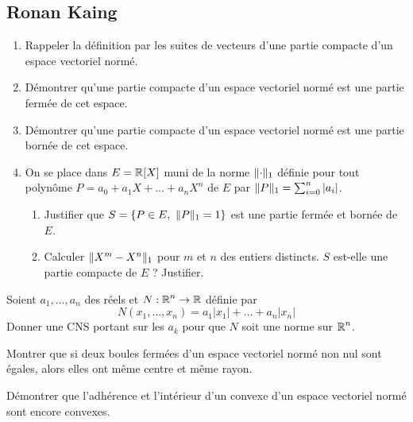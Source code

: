 \documentclass[10pt]{scrartcl}
\begin{document}
    \newpage
    \subsection*{Ronan Kaing}
    \begin{ccp}
        \hfill
        \begin{enumerate}
            \item Rappeler la définition par les suites de vecteurs d'une partie compacte d'un espace vectoriel normé.
            \item Démontrer qu'une partie compacte d'un espace vectoriel normé est une partie fermée de cet espace.
            \item Démontrer qu'une partie compacte d'un espace vectoriel normé est une partie bornée de cet espace.
            \item On se place dans $E=\operatorname{\mathbb R}[X]$ muni de la norme $\lVert \cdot\rVert_1$ définie pour tout polynôme $P=a_0+a_1X+\dots+a_nX^n$ de $E$ par $\lVert P\rVert_1=\sum_{i=0}^n|a_i|$.
            \begin{enumerate}
                \item Justifier que $S=\lbrace P\in E,\ \norm{P}_1=1\rbrace$ est une partie fermée et bornée de $E$.
                \item Calculer $\lVert X^m-X^n\rVert_1$ pour $m$ et $n$ des entiers distincts. $S$ est-elle une partie compacte de $E$ ? Justifier.
            \end{enumerate}
        \end{enumerate}
    \end{ccp}

    \begin{exo}
        Soient $a_1,\dots,a_n$ des réels et $N:\operatorname{\mathbb R}^n\to\operatorname{\mathbb R}$ définie par 
        \[
            N(x_1,\dots,x_n)=a_1|x_1|+\dots+a_n|x_n|
        \]
        Donner une CNS portant sur les $a_k$ pour que $N$ soit une norme sur $\operatorname{\mathbb R}^n$.
    \end{exo}

    \begin{exo}
        Montrer que si deux boules fermées d'un espace vectoriel normé non nul sont égales, alors elles ont même centre et même rayon.
    \end{exo}

    \begin{exo}
        Démontrer que l'adhérence et l'intérieur d'un convexe d'un espace vectoriel normé sont encore convexes.
    \end{exo}
\end{document}
